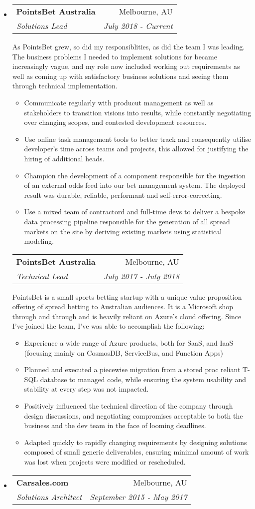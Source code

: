 \documentclass[letterpaper,11pt]{article}
\makeatletter
\newlength{\outerbordwidth}
\newcommand{\resitem}[1]{\item #1 \vspace{-2pt}}
\newcommand{\resheading}[1]{\vspace{-7pt}
  \parbox{\textwidth}{\setlength{\FrameSep}{\outerbordwidth}
    \begin{shaded}
\setlength{\fboxsep}{0pt}\framebox[\textwidth][l]{\setlength{\fboxsep}{4pt}\fcolorbox{shadecolorB}{shadecolorB}{\textbf{\sffamily{\mbox{~}\makebox[6.762in][l]{\large #1} \vphantom{p\^{E}}}}}}
    \end{shaded}
  }\vspace{-5pt}
}
\newcommand{\ressubheading}[4]{
\begin{tabular*}{6.5in}{l@{\cftdotfill{\cftsecdotsep}\extracolsep{\fill}}r}
		\textbf{#1} & #2 \\
		\textit{#3} & \textit{#4} \\
\end{tabular*}\vspace{-6pt}}
\makeatother
\begin{document}
\resheading{Employment History}
\begin{itemize}
\item

	\ressubheading{PointsBet Australia}{Melbourne, AU}{Solutions Lead}{July 2018 - Current}
	
	As PointsBet grew, so did my responsiblities, as did the team I was leading. The business problems I needed to implement solutions for became increasingly vague, and my role now included working out requirements as well as coming up with satisfactory business solutions and seeing them through technical implementation.
	
\begin{itemize}
	\resitem{Communicate regularly with producut management as well as stakeholders to transition visions into results, while constantly negotiating over changing scopes, and contested development resources.}
	\resitem{Use online task management tools to better track and consequently utilise developer's time across teams and projects, this allowed for justifying the hiring of additional heads.}
	\resitem{Champion the development of a component responsible for the ingestion of an external odds feed into our bet management system. The deployed result was durable, reliable, performant and self-error-correcting.}
	\resitem{Use a mixed team of contractord and full-time devs to deliver a bespoke data processing pipeline responsible for the generation of all spread markets on the site by deriving existing markets using statistical modeling.}
\end{itemize}
	
	\ressubheading{PointsBet Australia}{Melbourne, AU}{Technical Lead}{July 2017 - July 2018}
	
	PointsBet is a small sports betting startup with a unique value proposition offering of spread betting to Australian audiences. It is a Microsoft shop through and through and is heavily reliant on Azure's cloud offering.
	Since I've joined the team, I've was able to accomplish the following:
	
	\begin{itemize}
		\resitem{Experience a wide range of Azure products, both for SaaS, and IaaS (focusing mainly on CosmosDB, ServiceBus, and Function Apps)}
		\resitem{Planned and executed a piecewise migration from a stored proc reliant T-SQL database to managed code, while ensuring the system usability and stability at every step was not impacted.}
		\resitem{Positively influenced the technical direction of the company through design discussions, and negotiating compromises acceptable to both the business and the dev team in the face of looming deadlines.}
		\resitem{Adapted quickly to rapidly changing requirements by designing solutions composed of small generic deliverables, ensuring minimal amount of work was lost when projects were modified or rescheduled.}
	\end{itemize}
\item
	\ressubheading{Carsales.com}{Melbourne, AU}{Solutions Architect}{September 2015 - May 2017}


\end{itemize}
\end{document}
